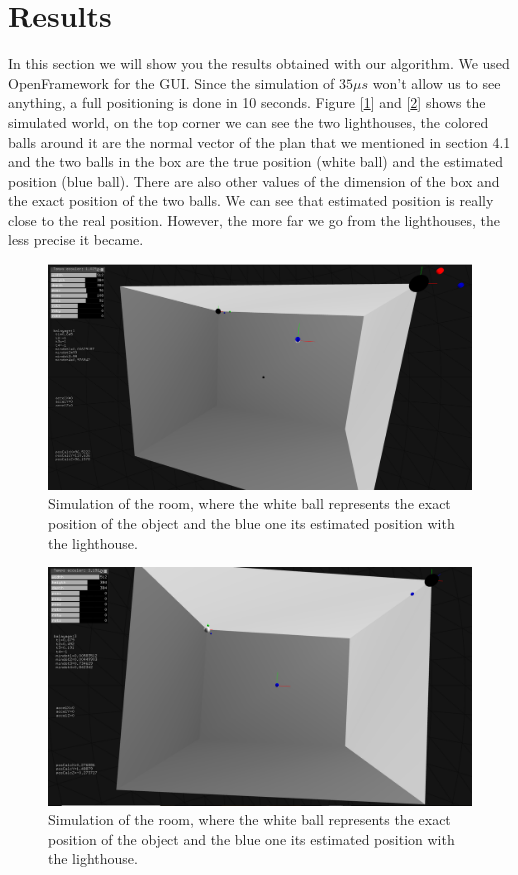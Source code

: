 \documentclass{vldb}
\begin{document}
\section{Results}

In this section we will show you the results obtained with our algorithm. We used OpenFramework for the GUI. Since the simulation of $35 \mu s $ won't allow us to see anything, a full positioning is done in 10 seconds. Figure [\ref{g1}] and [\ref{g2}] shows the simulated world, on the top corner we can see the two lighthouses, the colored balls around it are the normal vector of the plan that we mentioned in section 4.1 and the two balls in the box are the true position (white ball) and the estimated position (blue ball). There are also other values of the dimension of the box and the exact position of the two balls. We can see that estimated position is really close to the real position. However, the more far we go from the lighthouses, the less precise it became.
 \begin{figure}
\includegraphics[width=1.0\columnwidth]{Image/GUI2.png}
\caption{Simulation of the room, where the white ball represents the exact position of the object and the blue one its estimated position with the lighthouse.}
\label{g1}
\end{figure}

 \begin{figure}
 \centering
\includegraphics[width=1.0\columnwidth]{Image/GUI1.png}
\caption{Simulation of the room, where the white ball represents the exact position of the object and the blue one its estimated position with the lighthouse.}
\label{g2}
\end{figure}
\end{document}
